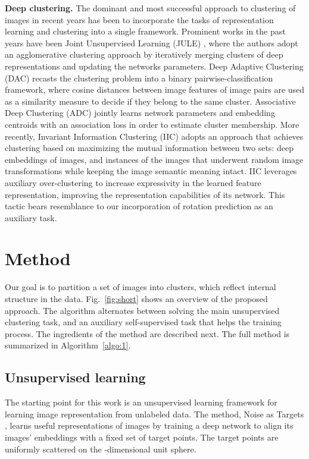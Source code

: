 \documentclass[a4paper,conference]{IEEEtran}
\begin{document}
\textbf{Deep clustering.} The dominant and most successful approach to clustering of images in recent years has been to incorporate the tasks of representation learning and clustering into a single framework. Prominent works in the past years have been Joint Unsupervised Learning (JULE) \cite{yangCVPR2016joint}, where the authors adopt an agglomerative clustering approach by iteratively merging clusters of deep representations and updating the networks parameters. Deep Adaptive Clustering (DAC) \cite{Chang2017DeepAI} recasts the clustering problem into a binary pairwise-classification framework, where cosine distances between image features of image pairs are used as a similarity measure to decide if they belong to the same cluster. Associative Deep Clustering (ADC) \cite{Husser2017AssociativeDC} jointly learns network parameters and embedding centroids with an association loss in order to estimate cluster membership. More recently, Invariant Information Clustering (IIC) \cite{iic} adopts an approach that achieves clustering based on maximizing the mutual information between two sets: deep embeddings of images, and instances of the images that underwent  random image transformations while keeping the image semantic meaning intact. IIC leverages auxiliary over-clustering to increase expressivity in the learned feature representation, improving the representation capabilities of its network. This tactic bears resemblance to our incorporation of rotation prediction as an auxiliary task.

\section{Method}
\label{sec:method}

Our goal is to partition a set of images into  clusters, which reflect internal structure in the data. Fig.~\ref{fig:short} shows an overview of the proposed approach. The algorithm alternates between solving the main unsupervised clustering task, and an auxiliary self-supervised task that helps the training process. The ingredients of the method are described next. The full method is summarized in Algorithm~\ref{algo:1}.

\subsection{Unsupervised learning}

The starting point for this work is an unsupervised learning framework for learning image representation from unlabeled data. The method, Noise as Targets \cite{BJ2017}, learns useful representations of images by training a deep network to align its images' embeddings with a fixed set of target points. The target points are uniformly scattered on the -dimensional unit sphere. 
\end{document}
